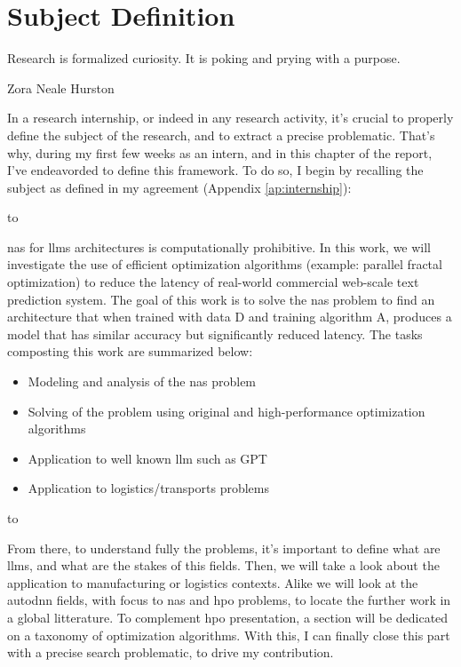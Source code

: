 \chapter{Subject Definition}
\label{chap:subject_def}

\epigraph{Research is formalized curiosity. It is poking and prying with a purpose.}{Zora Neale Hurston}

In a research internship, or indeed in any research activity, it's crucial to properly define the subject of the research, and to extract a precise problematic. That's why, during my first few weeks as an intern, and in this chapter of the report, I've endeavorded to define this framework. To do so, I begin by recalling the subject as defined in my agreement (Appendix \ref{ap:internship}):

\noindent\hbox to \textwidth{\hrulefill}

\gls{nas} for \glspl{llm} architectures is computationally prohibitive. In this work, we will investigate the use of efficient optimization algorithms (example: parallel fractal optimization) to reduce the latency of real-world commercial web-scale text prediction system. The goal of this work is to solve the \gls{nas} problem to find an architecture that when trained with data D and training algorithm A, produces a model that has similar accuracy but significantly reduced latency.
The tasks composting this work are summarized below:
\begin{itemize}
    \item Modeling and analysis of the \acrshort{nas} problem
    \item Solving of the problem using original and high-performance optimization algorithms
    \item Application to well known \acrshort{llm} such as GPT
    \item Application to logistics/transports problems
\end{itemize}
\noindent\hbox to \textwidth{\hrulefill}


From there, to understand fully the problems, it's important to define what are \glspl{llm}, and what are the stakes of this fields. Then, we will take a look about the application to manufacturing or logistics contexts. Alike we will look at the \gls{autodnn} fields, with focus to \gls{nas} and \acrshort{hpo} problems, to locate the further work in a global litterature. To complement \gls{hpo} presentation, a section will be dedicated on a taxonomy of optimization algorithms. With this, I can finally close this part with a precise search problematic, to drive my contribution.

